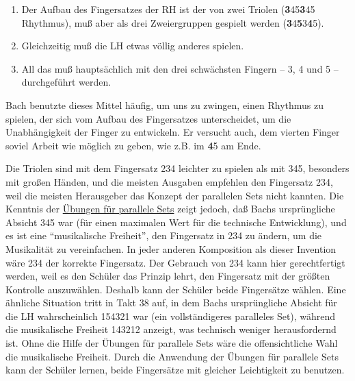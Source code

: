 \begin{enumerate}[label={\roman*.}] 
 \item Der Aufbau des Fingersatzes der RH ist der von zwei Triolen (\textbf{3}45\textbf{3}45 Rhythmus), muß aber als drei Zweiergruppen gespielt werden (\textbf{3}4\textbf{5}3\textbf{4}5).
 \item Gleichzeitig muß die LH etwas völlig anderes spielen.
 \item All das muß hauptsächlich mit den drei schwächsten Fingern -- 3, 4 und 5 -- durchgeführt werden.
\end{enumerate}
Bach benutzte dieses Mittel häufig, um uns zu zwingen, einen Rhythmus zu spielen, der sich vom Aufbau des Fingersatzes unterscheidet, um die Unabhängigkeit der Finger zu entwickeln.
Er versucht auch, dem vierten Finger soviel Arbeit wie möglich zu geben, wie z.B. im \textbf{4}5 am Ende.

Die Triolen sind mit dem Fingersatz 234 leichter zu spielen als mit 345, besonders mit großen Händen, und die meisten Ausgaben empfehlen den Fingersatz 234, weil die meisten Herausgeber das Konzept der parallelen Sets nicht kannten.
Die Kenntnis der \hyperref[c1iii7b]{Übungen für parallele Sets} zeigt jedoch, daß Bachs ursprüngliche Absicht 345 war (für einen maximalen Wert für die technische Entwicklung), und es ist eine \enquote{musikalische Freiheit}, den Fingersatz in 234 zu ändern, um die Musikalität zu vereinfachen.
In jeder anderen Komposition als dieser Invention wäre 234 der korrekte Fingersatz.
Der Gebrauch von 234 kann hier gerechtfertigt werden, weil es den Schüler das Prinzip lehrt, den Fingersatz mit der größten Kontrolle auszuwählen.
Deshalb kann der Schüler beide Fingersätze wählen.
Eine ähnliche Situation tritt in Takt 38 auf, in dem Bachs ursprüngliche Absicht für die LH wahrscheinlich 154321 war (ein vollständigeres paralleles Set), während die musikalische Freiheit 143212 anzeigt, was technisch weniger herausfordernd ist.
Ohne die Hilfe der Übungen für parallele Sets wäre die offensichtliche Wahl die musikalische Freiheit.
Durch die Anwendung der Übungen für parallele Sets kann der Schüler lernen, beide Fingersätze mit gleicher Leichtigkeit zu benutzen.

